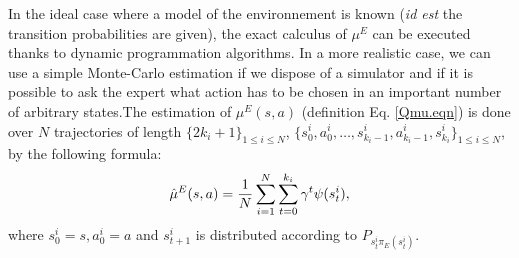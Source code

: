 \documentclass{article}
\begin{document}
In the ideal case where a model of the environnement is known (\textit{id est} the transition probabilities are given), the exact calculus of $\mu^E$ can be executed thanks to dynamic programmation algorithms. In a more realistic case, we can use a simple Monte-Carlo estimation if we dispose of a simulator and if it is possible to ask the expert what action has to be chosen in an important number of arbitrary states.The estimation of $\mu^E(s,a)$ (definition Eq. \eqref{Qmu.eqn}) is done over $N$ trajectories of length $\{2k_i+1\}_{1\leq i \leq N}$, $\{s^i_0,a^i_0,\dots,s^i_{k_i-1},a^i_{k_i-1},s^i_{k_i}\}_{1\leq i \leq N}$, by the following formula: \begin{equation}
\hat\mu^E(s,a) = {1\over N}\sum_{i=1}^{N}\sum^{k_i}_{t=0}\gamma^t\psi(s^i_t),
\end{equation}
where $s^i_0=s, a^i_0=a$ and $s^i_{t+1}$ is distributed according to $P_{s^i_t\pi_E(s^i_t)}$.
\end{document}
